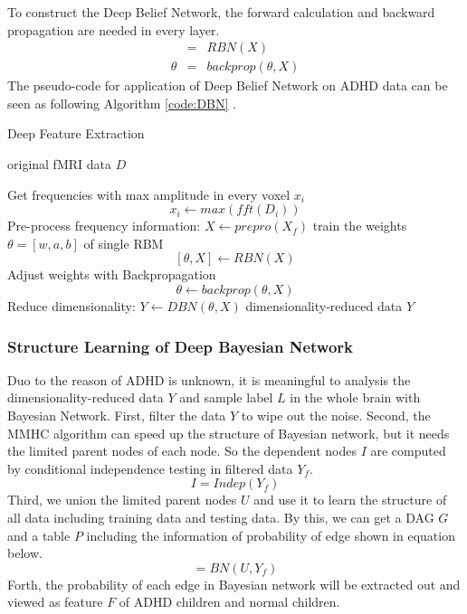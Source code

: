 \documentclass[10pt,twocolumn,letterpaper]{article}
\begin{document}
To construct the Deep Belief Network, the forward calculation and backward propagation are needed in every layer.
\begin{eqnarray}
[\theta,X] &=& RBN(X)   \\
\theta  &=& backprop(\theta,X)
\end{eqnarray}
The pseudo-code for application of Deep Belief Network on ADHD data can be seen as following Algorithm \ref{code:DBN} .
\begin{algorithm}[h]
\caption{Deep Feature Extraction}
\label{code:DBN}
\begin{algorithmic}[1]
\Require
original fMRI data $D$

\State Get frequencies with max amplitude in every voxel $x_i$
\[ x_i \gets max(fft(D_i))\]
\State Pre-process frequency information: $X \gets prepro(X_f)$ 
\State train the weights $\theta=[w,a,b]$ of single RBM
\[
[\theta,X]\gets RBN(X)
\]
\EndFor
\State Adjust weights with Backpropagation
\[
\theta \gets backprop(\theta,X)
\]
\State Reduce dimensionality:  $Y \gets DBN(\theta,X)$ 
\Ensure
dimensionality-reduced data $Y$
\end{algorithmic}
\end{algorithm}


\subsubsection{Structure Learning of Deep Bayesian Network}
Duo to the reason of ADHD is unknown, it is meaningful to analysis the
dimensionality-reduced data $Y$ and sample label $L$ in the
whole brain with Bayesian Network. First, filter the data $Y$ to wipe out the noise. Second, the MMHC algorithm can speed up the structure of Bayesian network, but it needs the limited parent nodes of each node. So the dependent nodes $I$ are computed by conditional independence testing in filtered data $Y_f$.
\begin{equation}
I = Indep(Y_f)
\end{equation}
Third, we union the limited parent nodes $U$ and use it to learn the structure of all data including training data and testing data. By this, we can get a DAG $G$ and a table $P$ including the information of probability of edge shown in equation below.
\begin{equation}
[G,P] = BN(U,Y_f)
\end{equation}
Forth, the probability of each edge in Bayesian network will be extracted out and viewed as feature $F$ of ADHD children and normal children.
\end{document}
